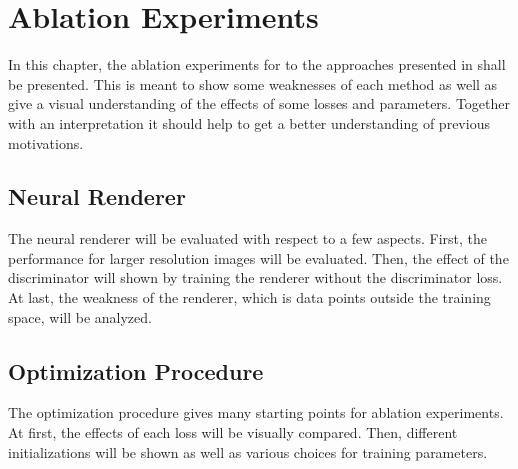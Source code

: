 \setchapterpreamble[u]{\margintoc}
\chapter{Ablation Experiments}

In this chapter, the ablation experiments for to the approaches presented in 
shall be presented.
This is meant to show some weaknesses of each method as well as give a visual understanding
of the effects of some losses and parameters.
Together with an interpretation it should help to get a better understanding of previous
motivations.


\section{Neural Renderer}

The neural renderer will be evaluated with respect to a few aspects.
First, the performance for larger resolution images will be evaluated.
Then, the effect of the discriminator will shown by training the renderer without
the discriminator loss.
At last, the weakness of the renderer, which is data points outside the training space,
will be analyzed.

\section{Optimization Procedure}

The optimization procedure gives many starting points for ablation experiments.
At first, the effects of each loss will be visually compared.
Then, different initializations will be shown as well as various choices for training
parameters.


